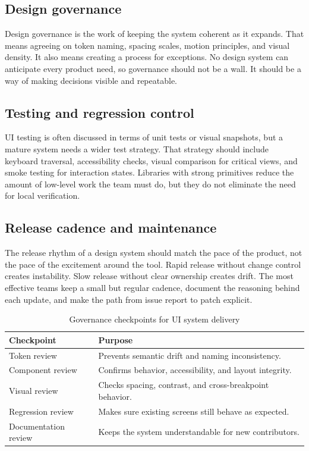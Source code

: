 \documentclass[11pt,twoside,a4paper]{article}
\begin{document}
\subsection{Design governance}
Design governance is the work of keeping the system coherent as it expands. That means agreeing on token naming, spacing scales, motion principles, and visual density. It also means creating a process for exceptions. No design system can anticipate every product need, so governance should not be a wall. It should be a way of making decisions visible and repeatable.

\subsection{Testing and regression control}
UI testing is often discussed in terms of unit tests or visual snapshots, but a mature system needs a wider test strategy. That strategy should include keyboard traversal, accessibility checks, visual comparison for critical views, and smoke testing for interaction states. Libraries with strong primitives reduce the amount of low-level work the team must do, but they do not eliminate the need for local verification.

\subsection{Release cadence and maintenance}
The release rhythm of a design system should match the pace of the product, not the pace of the excitement around the tool. Rapid release without change control creates instability. Slow release without clear ownership creates drift. The most effective teams keep a small but regular cadence, document the reasoning behind each update, and make the path from issue report to patch explicit.

\begin{table}[htbp]
  \centering
  \caption{Governance checkpoints for UI system delivery}
  \begin{tabularx}{\textwidth}{@{}p{}Y@{}}
    \toprule
    \textbf{Checkpoint} & \textbf{Purpose} \\
    \midrule
    Token review & Prevents semantic drift and naming inconsistency. \\
    Component review & Confirms behavior, accessibility, and layout integrity. \\
    Visual review & Checks spacing, contrast, and cross-breakpoint behavior. \\
    Regression review & Makes sure existing screens still behave as expected. \\
    Documentation review & Keeps the system understandable for new contributors. \\
    \bottomrule
  \end{tabularx}
\end{table}
\end{document}
